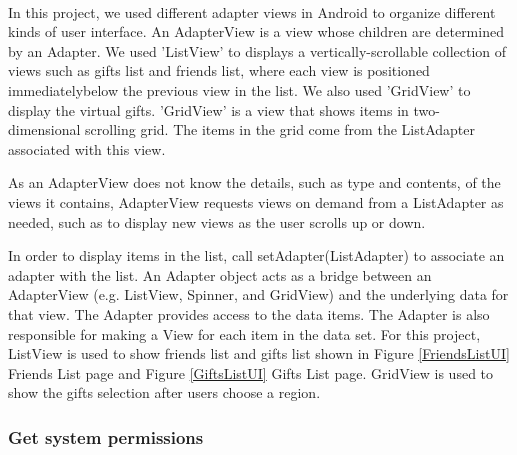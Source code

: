 \paragraph{}
In this project, we used different adapter views in Android to organize different kinds of user interface. An AdapterView is a view whose children are determined by an Adapter. We used {\ttfamily 'ListView'} to displays a vertically-scrollable collection of views such as gifts list and friends list, where each view is positioned immediatelybelow the previous view in the list. We also used {\ttfamily 'GridView'} to display the virtual gifts. {\ttfamily 'GridView'} is a view that shows items in two-dimensional scrolling grid. The items in the grid come from the ListAdapter associated with this view. 
\par As an AdapterView does not know the details, such as type and contents, of the views it contains, AdapterView requests views on demand from a ListAdapter as needed, such as to display new views as the user scrolls up or down.
\par In order to display items in the list, call setAdapter(ListAdapter) to associate an adapter with the list. 
An Adapter object acts as a bridge between an AdapterView (e.g. ListView, Spinner, and GridView) and the underlying data for that view. The Adapter provides access to the data items. The Adapter is also responsible for making a View for each item in the data set. For this project, ListView is used to show friends list and gifts list shown in Figure \ref{FriendsListUI} Friends List page and Figure \ref{GiftsListUI} Gifts List page. GridView is used to show the gifts selection after users choose a region. 

\subsubsection{Get system permissions}
\label{subsubsec:GetSystemPermissions}
